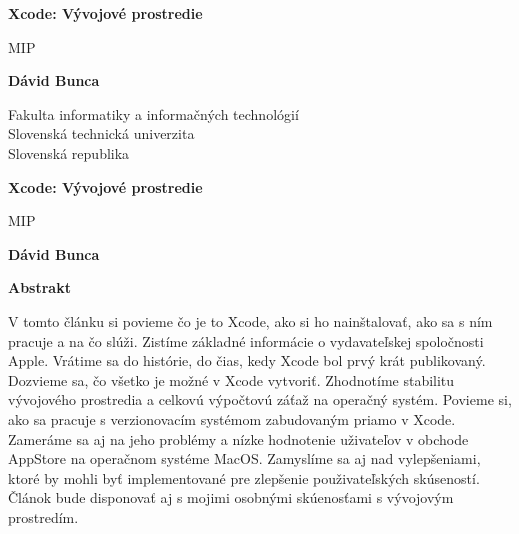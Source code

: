 \documentclass{article}
\begin{document}
\begin{titlepage}
    \begin{center}
        
            
        \Huge
        \textbf{Xcode: Vývojové prostredie}
            
        \vspace{0.5cm}
        \LARGE
	MIP
        
            
        \vspace{1.5cm}
            
        \textbf{Dávid Bunca}
            
        \vfill
            
            
        \vspace{0.8cm}

        \centering   
            
        \Large
        Fakulta informatiky a informačných technológií\\
        Slovenská technická univerzita\\
        Slovenská republika\\
        
            
    \end{center}
\end{titlepage}

\begin{center}
    \Large
    \textbf{Xcode: Vývojové prostredie}
        
    \vspace{0.4cm}
    \large
    MIP
        
    \vspace{0.4cm}
    \textbf{Dávid Bunca}
       
    \vspace{0.9cm}
    \textbf{Abstrakt}
\end{center}

V tomto článku si povieme čo je to Xcode, ako si ho nainštalovať, ako sa s ním pracuje a na čo slúži. Zistíme základné informácie o vydavateľskej spoločnosti Apple. Vrátime sa do histórie, do čias, kedy Xcode bol prvý krát publikovaný. Dozvieme sa, čo všetko je možné v Xcode vytvoriť. Zhodnotíme stabilitu vývojového prostredia a celkovú výpočtovú záťaž na operačný systém. Povieme si, ako sa pracuje s verzionovacím systémom zabudovaným priamo v Xcode. Zameráme sa aj na jeho problémy a nízke hodnotenie uživateľov v obchode AppStore na operačnom systéme MacOS. Zamyslíme sa aj nad vylepšeniami, ktoré by mohli byť implementované pre zlepšenie použivateľských skúseností. Článok bude disponovať aj s mojimi osobnými skúenosťami s vývojovým prostredím.
\end{document}

